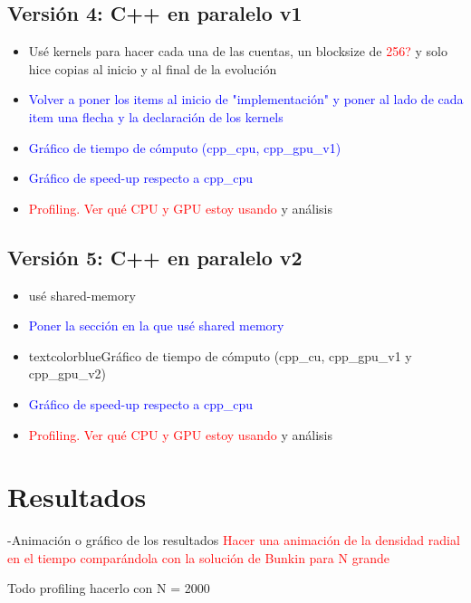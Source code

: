 \documentclass[aps,prb,twocolumn,superscriptaddress,floatfix,longbibliography]{revtex4-2}
\newcounter{para}
\begin{document}
\begin{itemize}
\subsection{Versión 4: C++ en paralelo v1}

\begin{itemize}
    \item Usé kernels para hacer cada una de las cuentas, un blocksize de \textcolor{red}{256?} y solo hice copias al inicio y al final de la evolución
    \item \textcolor{blue}{Volver a poner los items al inicio de "implementación" y poner al lado de cada item una flecha y la declaración de los kernels}
    \item \textcolor{blue}{Gráfico de tiempo de cómputo (cpp_cpu, cpp_gpu_v1)}
    \item \textcolor{blue}{Gráfico de speed-up respecto a cpp_cpu}
    \item \textcolor{red}{Profiling. Ver qué CPU y GPU estoy usando} y análisis
\end{itemize}

\subsection{Versión 5: C++ en paralelo v2}

\begin{itemize}
    \item usé shared-memory
    \item \textcolor{blue}{Poner la sección en la que usé shared memory}
    \item textcolor{blue}{Gráfico de tiempo de cómputo (cpp_cu, cpp_gpu_v1 y cpp_gpu_v2)}
    \item \textcolor{blue}{Gráfico de speed-up respecto a cpp_cpu}
    \item \textcolor{red}{Profiling. Ver qué CPU y GPU estoy usando} y análisis
\end{itemize}

\section{Resultados}

-Animación o gráfico de los resultados
\textcolor{red}{Hacer una animación de la densidad radial en el tiempo comparándola con la solución de Bunkin para N grande}



Todo profiling hacerlo con N = 2000


\end{itemize}
\end{document}
